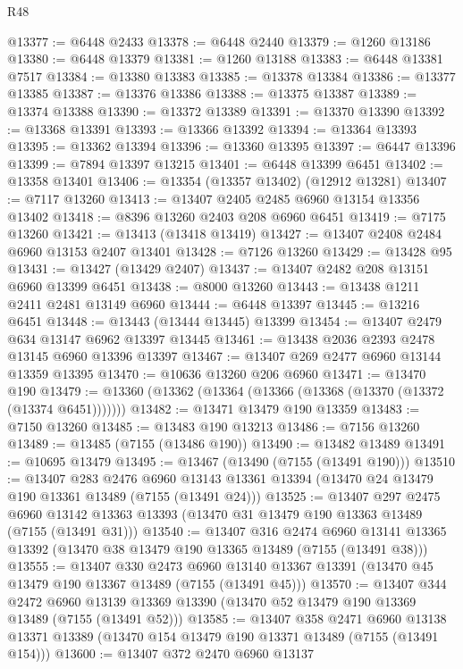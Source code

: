 \begin{lexlean}{R48}
\begin{coremodule}
@13377 := @6448 @2433
@13378 := @6448 @2440
@13379 := @1260 @13186
@13380 := @6448 @13379
@13381 := @1260 @13188
@13383 := @6448 @13381 @7517
@13384 := @13380 @13383
@13385 := @13378 @13384
@13386 := @13377 @13385
@13387 := @13376 @13386
@13388 := @13375 @13387
@13389 := @13374 @13388
@13390 := @13372 @13389
@13391 := @13370 @13390
@13392 := @13368 @13391
@13393 := @13366 @13392
@13394 := @13364 @13393
@13395 := @13362 @13394
@13396 := @13360 @13395
@13397 := @6447 @13396
@13399 := @7894 @13397 @13215
@13401 := @6448 @13399 @6451
@13402 := @13358 @13401
@13406 := @13354 (@13357 @13402) (@12912 @13281)
@13407 := @7117 @13260
@13413 := @13407 @2405 @2485 @6960 @13154 @13356 @13402
@13418 := @8396 @13260 @2403 @208 @6960 @6451
@13419 := @7175 @13260
@13421 := @13413 (@13418 @13419)
@13427 := @13407 @2408 @2484 @6960 @13153 @2407 @13401
@13428 := @7126 @13260
@13429 := @13428 @95
@13431 := @13427 (@13429 @2407)
@13437 := @13407 @2482 @208 @13151 @6960 @13399 @6451
@13438 := @8000 @13260
@13443 := @13438 @1211 @2411 @2481 @13149 @6960
@13444 := @6448 @13397
@13445 := @13216 @6451
@13448 := @13443 (@13444 @13445) @13399
@13454 := @13407 @2479 @634 @13147 @6962 @13397 @13445
@13461 := @13438 @2036 @2393 @2478 @13145 @6960 @13396 @13397
@13467 := @13407 @269 @2477 @6960 @13144 @13359 @13395
@13470 := @10636 @13260 @206 @6960
@13471 := @13470 @190
@13479 := @13360 (@13362 (@13364 (@13366 (@13368 (@13370 (@13372 (@13374 @6451)))))))
@13482 := @13471 @13479 @190 @13359
@13483 := @7150 @13260
@13485 := @13483 @190 @13213
@13486 := @7156 @13260
@13489 := @13485 (@7155 (@13486 @190))
@13490 := @13482 @13489
@13491 := @10695 @13479
@13495 := @13467 (@13490 (@7155 (@13491 @190)))
@13510 := @13407
    @283
    @2476
    @6960
    @13143
    @13361
    @13394
    (@13470 @24 @13479 @190 @13361 @13489 (@7155 (@13491 @24)))
@13525 := @13407
    @297
    @2475
    @6960
    @13142
    @13363
    @13393
    (@13470 @31 @13479 @190 @13363 @13489 (@7155 (@13491 @31)))
@13540 := @13407
    @316
    @2474
    @6960
    @13141
    @13365
    @13392
    (@13470 @38 @13479 @190 @13365 @13489 (@7155 (@13491 @38)))
@13555 := @13407
    @330
    @2473
    @6960
    @13140
    @13367
    @13391
    (@13470 @45 @13479 @190 @13367 @13489 (@7155 (@13491 @45)))
@13570 := @13407
    @344
    @2472
    @6960
    @13139
    @13369
    @13390
    (@13470 @52 @13479 @190 @13369 @13489 (@7155 (@13491 @52)))
@13585 := @13407
    @358
    @2471
    @6960
    @13138
    @13371
    @13389
    (@13470 @154 @13479 @190 @13371 @13489 (@7155 (@13491 @154)))
@13600 := @13407
    @372
    @2470
    @6960
    @13137

\end{coremodule}
\end{lexlean}
